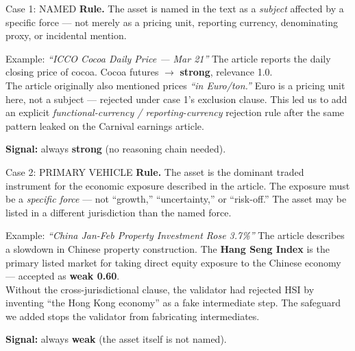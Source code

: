 \documentclass[10pt,aspectratio=169]{beamer}
\begin{document}
\begin{frame}{Case 1: NAMED}
  \small
  \textbf{Rule.} The asset is named in the text as a \emph{subject} affected
  by a specific force --- not merely as a pricing unit, reporting currency,
  denominating proxy, or incidental mention.

  \medskip
  \begin{block}{Example: \textit{``ICCO Cocoa Daily Price --- Mar 21''}}
    The article reports the daily closing price of cocoa.
    Cocoa futures $\to$ \textbf{strong}, relevance 1.0. \\[4pt]
    The article originally also mentioned prices \textit{``in Euro/ton.''}
    Euro is a pricing unit here, not a subject --- rejected under case 1's
    exclusion clause. This led us to add an explicit
    \textit{functional-currency / reporting-currency} rejection rule after
    the same pattern leaked on the Carnival earnings article.
  \end{block}

  \medskip
  \textbf{Signal:} always \textbf{strong} (no reasoning chain needed).
\end{frame}

\begin{frame}{Case 2: PRIMARY VEHICLE}
  \small
  \textbf{Rule.} The asset is the dominant traded instrument for the economic
  exposure described in the article. The exposure must be a \emph{specific
  force} --- not ``growth,'' ``uncertainty,'' or ``risk-off.'' The asset may
  be listed in a different jurisdiction than the named force.

  \medskip
  \begin{block}{Example: \textit{``China Jan-Feb Property Investment Rose 3.7\%''}}
    The article describes a slowdown in Chinese property construction.
    The \textbf{Hang Seng Index} is the primary listed market for taking
    direct equity exposure to the Chinese economy --- accepted as
    \textbf{weak 0.60}. \\[4pt]
    Without the cross-jurisdictional clause, the validator had rejected HSI
    by inventing ``the Hong Kong economy'' as a fake intermediate step.
    The safeguard we added stops the validator from fabricating intermediates.
  \end{block}

  \medskip
  \textbf{Signal:} always \textbf{weak} (the asset itself is not named).
\end{frame}
\end{document}
